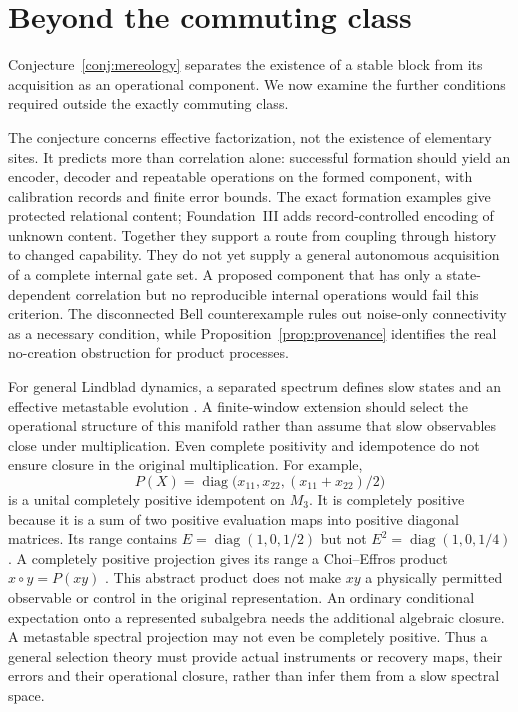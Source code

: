 \documentclass[12pt,a4paper]{article}
\begin{document}
\section{Beyond the commuting class}
\label{sec:conj}

Conjecture~\ref{conj:mereology} separates the existence of a stable block from
its acquisition as an operational component. We now examine the further
conditions required outside the exactly commuting class.

The conjecture concerns effective factorization, not the existence
of elementary sites. It predicts more than correlation alone:
successful formation should yield an encoder, decoder and
repeatable operations on the formed component, with calibration
records and finite error bounds. The exact formation examples give
protected relational content; Foundation~III adds record-controlled
encoding of unknown content. Together they support a route from
coupling through history to changed capability. They do not yet
supply a general autonomous acquisition of a complete internal gate
set. A proposed component that has only a state-dependent correlation
but no reproducible internal operations would fail this criterion.
The disconnected Bell counterexample rules out noise-only
connectivity as a necessary condition, while
Proposition~\ref{prop:provenance} identifies the real no-creation
obstruction for product processes.

For general Lindblad dynamics, a separated spectrum defines slow
states and an effective metastable evolution
\cite{Macieszczak2016}. A finite-window extension should select the
operational structure of this manifold rather than assume that slow
observables close under multiplication. Even complete positivity
and idempotence do not ensure closure in the original multiplication.
For example,
\begin{equation}\label{eq:cp-range}
 P(X)=\operatorname{diag}\bigl(x_{11},x_{22},
                                      (x_{11}+x_{22})/2\bigr)
\end{equation}
is a unital completely positive idempotent on $M_3$.
It is completely positive because it is a sum of two positive
evaluation maps into positive diagonal matrices. Its range contains
$E=\operatorname{diag}(1,0,1/2)$ but not
$E^2=\operatorname{diag}(1,0,1/4)$.
A completely positive projection gives its range a Choi--Effros
product $x\circ y=P(xy)$ \cite{ChoiEffros1977,BlecherNeal2016}.
This abstract product does not make $xy$ a physically permitted
observable or control in the original representation. An ordinary
conditional expectation onto a represented subalgebra needs the
additional algebraic closure. A metastable spectral projection may
not even be completely positive. Thus a general selection theory
must provide actual instruments or recovery maps, their errors and
their operational closure, rather than infer them from a slow
spectral space.
\end{document}
